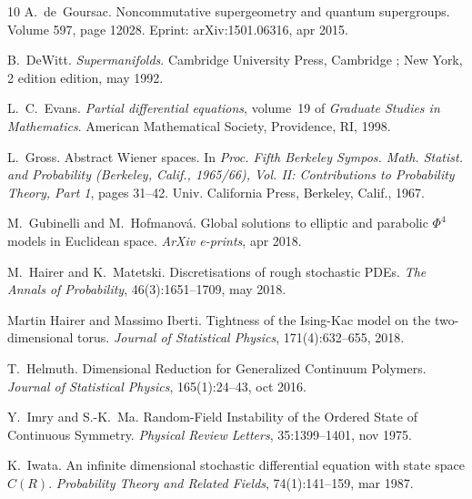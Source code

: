 \documentclass[a4paper,10pt]{article}
\newcommand{\tmtextit}[1]{{\itshape{#1}}}
\begin{document}
\begin{thebibliography}{10}
  A.~de~Goursac.
  {\newblock}Noncommutative supergeometry and quantum supergroups.
  {\newblock}Volume  597,  page  12028. Eprint: arXiv:1501.06316, apr
  2015.{\newblock}
  
  B.~DeWitt.
  {\newblock}\tmtextit{Supermanifolds}. {\newblock}Cambridge University Press,
  Cambridge ; New York, 2 edition  edition, may 1992.{\newblock}
  
  L.~C.~Evans. {\newblock}\tmtextit{Partial
  differential equations},  volume~19  of \tmtextit{Graduate Studies in
  Mathematics}. {\newblock}American Mathematical Society, Providence, RI,
  1998.{\newblock}
  
  L.~Gross. {\newblock}Abstract Wiener spaces.
  {\newblock}In \tmtextit{Proc. Fifth Berkeley Sympos. Math. Statist. and
  Probability (Berkeley, Calif., 1965/66), Vol. II: Contributions to
  Probability Theory, Part 1},  pages  31--42. Univ. California Press,
  Berkeley, Calif., 1967.{\newblock}
  
  M.~Gubinelli  and  M.~Hofmanov{\'a}. {\newblock}Global
  solutions to elliptic and parabolic $\Phi^4$ models in Euclidean space.
  {\newblock}\tmtextit{ArXiv e-prints}, apr 2018.{\newblock}
  
  M.~Hairer  and  K.~Matetski.
  {\newblock}Discretisations of rough stochastic PDEs.
  {\newblock}\tmtextit{The Annals of Probability}, 46(3):1651--1709, may
  2018.{\newblock}
  
  Martin Hairer  and  Massimo Iberti.
  {\newblock}Tightness of the Ising-Kac model on the two-dimensional torus.
  {\newblock}\tmtextit{Journal of Statistical Physics}, 171(4):632--655,
  2018.{\newblock}
  
  T.~Helmuth. {\newblock}Dimensional
  Reduction for Generalized Continuum Polymers. {\newblock}\tmtextit{Journal
  of Statistical Physics}, 165(1):24--43, oct 2016.{\newblock}
  
  Y.~Imry  and  S.-K.~Ma.
  {\newblock}Random-Field Instability of the Ordered State of Continuous
  Symmetry. {\newblock}\tmtextit{Physical Review Letters}, 35:1399--1401, nov
  1975.{\newblock}
  
  K.~Iwata. {\newblock}An infinite
  dimensional stochastic differential equation with state space $C (R)$.
  {\newblock}\tmtextit{Probability Theory and Related Fields}, 74(1):141--159,
  mar 1987.{\newblock}
  

\end{thebibliography}
\end{document}
